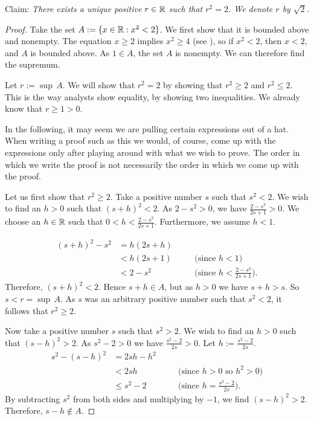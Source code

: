 \begin{example} \label{example:sqrt2}
Claim: \emph{There exists a unique positive
$r \in {\mathbb{R}}$ such that $r^2 = 2$.  We denote $r$ by $\sqrt{2}$.}

\begin{proof}
Take the set
$A := \{ x \in {\mathbb{R}} : x^2 < 2 \}$.  We first show that it is bounded above and
nonempty.  The equation $x \geq 2$ implies $x^2 \geq 4$
(see ), so
if $x^2 < 2$, then $x < 2$, and $A$ is bounded above.
As $1 \in A$, the set $A$ is nonempty.  We can therefore find the supremum.

Let $r := \sup\, A$.  We will show that $r^2 = 2$ by showing
that $r^2 \geq 2$ and $r^2 \leq 2$.  This is the way analysts show
equality, by showing two inequalities.
We already know that $r \geq 1 > 0$.

In the following, it may seem we are pulling certain expressions out of
a hat.  When writing a proof such as this we would, of course, come up with
the expressions only after playing around with what we wish to prove.  The
order in which we write the proof is not necessarily the order in which we
come up with the proof.

Let us first show that $r^2 \geq 2$.
Take a positive number $s$ such that $s^2 < 2$.  We wish to find an $h > 0$
such that ${(s+h)}^2 < 2$.
As $2-s^2 > 0$, we have $\frac{2-s^2}{2s+1} > 0$.
We choose an $h \in {\mathbb{R}}$ such that
$0 < h < \frac{2-s^2}{2s+1}$.
Furthermore, we assume $h < 1$.

\begin{equation*}
\begin{aligned}
{(s+h)}^2 - s^2 & = h(2s + h) \\
 & < h(2s+1) & & \quad \bigl(\text{since } h < 1\bigr) \\
 & < 2-s^2 & & \quad \bigl(\text{since } h < \tfrac{2-s^2}{2s+1} \bigr) .
\end{aligned}
\end{equation*}
Therefore, ${(s+h)}^2 < 2$.  Hence $s+h \in A$, but as $h > 0$
we have $s+h > s$.  So $s < r = \sup\, A$.  As $s$ was an arbitrary
positive number such that $s^2 < 2$, it follows that $r^2 \geq 2$.


Now take a positive number $s$ such that
$s^2 > 2$.  We wish to find an $h > 0$ such that
${(s-h)}^2 > 2$.
As 
$s^2-2 > 0$ we have $\frac{s^2-2}{2s} > 0$.
Let $h := \frac{s^2-2}{2s}$.
\begin{equation*}
\begin{aligned}
s^2 - {(s-h)}^2 & = 2sh - h^2 \\
 & < 2sh & & \quad \bigl( \text{since } h > 0 \text{ so } h^2 > 0 \bigr)  \\
 & \leq s^2-2 & & \quad \bigl( \text{since } h = \tfrac{s^2-2}{2s} \bigr) .
\end{aligned}
\end{equation*}
By subtracting $s^2$ from both sides and multiplying by $-1$, we find
${(s-h)}^2 > 2$.  Therefore, $s-h \notin A$.


\end{proof}
\end{example}
